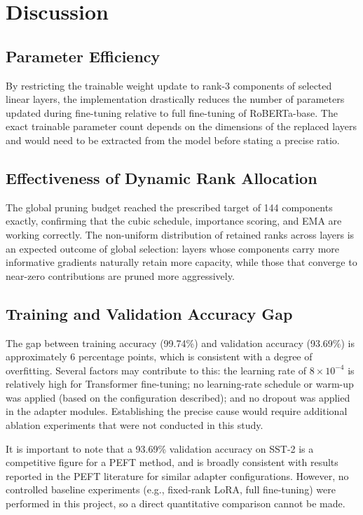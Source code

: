 \documentclass[conference]{IEEEtran}
\begin{document}
\section{Discussion}
\label{sec:discussion}

\subsection{Parameter Efficiency}
By restricting the trainable weight update to rank-3
components of selected linear layers, the implementation
drastically reduces the number of parameters updated during
fine-tuning relative to full fine-tuning of RoBERTa-base.
The exact trainable parameter count depends on the
dimensions of the replaced layers and would need to be
extracted from the model before stating a precise ratio.

\subsection{Effectiveness of Dynamic Rank Allocation}
The global pruning budget reached the prescribed target of
144 components exactly, confirming that the cubic schedule,
importance scoring, and EMA are working correctly. The
non-uniform distribution of retained ranks across layers is
an expected outcome of global selection: layers whose
components carry more informative gradients naturally retain
more capacity, while those that converge to near-zero
contributions are pruned more aggressively.

\subsection{Training and Validation Accuracy Gap}
The gap between training accuracy (99.74\%) and validation
accuracy (93.69\%) is approximately 6 percentage points,
which is consistent with a degree of overfitting. Several
factors may contribute to this: the learning rate of
$8 \times 10^{-4}$ is relatively high for Transformer
fine-tuning; no learning-rate schedule or warm-up was
applied (based on the configuration described); and no
dropout was applied in the adapter modules. Establishing the
precise cause would require additional ablation experiments
that were not conducted in this study.

It is important to note that a 93.69\% validation accuracy on
SST-2 is a competitive figure for a PEFT method, and is
broadly consistent with results reported in the PEFT
literature for similar adapter configurations. However, no
controlled baseline experiments (e.g., fixed-rank LoRA, full
fine-tuning) were performed in this project, so a direct
quantitative comparison cannot be made.
\end{document}

